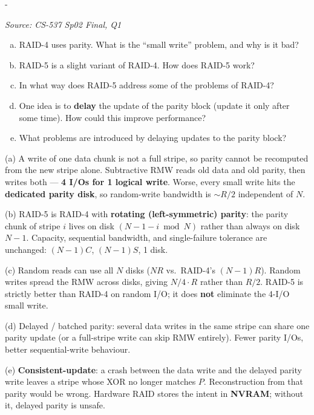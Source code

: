 \documentclass[11pt,a4paper]{article}
\makeatletter
\newcommand{\keepspace}[1]{\par\penalty-100\begingroup
  \setlength{\dimen@}{#1}\dimen@ii\pagegoal\advance\dimen@ii-\pagetotal
  \ifdim\dimen@>\dimen@ii\ifdim\dimen@ii>\z@\vfil\fi\break\fi\endgroup}
\newcounter{qn}[section]
\newenvironment{Qn}[4]{%
  \refstepcounter{qn}\keepspace{7\baselineskip}%
  \begin{tcolorbox}[qboxstyle, title={Q\thesection.\theqn\ \ [#1 \textbar\ #2]\ \ #4}]%
  {\footnotesize\color{g3}\textit{Source: #3}}\par\smallskip%
}{%
  \end{tcolorbox}%
}
\newenvironment{Sol}{%
  \begin{tcolorbox}[sboxstyle, title={Solution}]%
}{%
  \end{tcolorbox}\vspace{0.35em}%
}
\makeatother
\begin{document}
\begin{Qn}{Medium-Hard}{Lect 22A}{CS-537 Sp02 Final, Q1}{The small-write problem, RAID-5, and delayed parity}
\begin{enumerate}[(a)]
\item RAID-4 uses parity. What is the ``small write'' problem, and why
      is it bad?
\item RAID-5 is a slight variant of RAID-4. How does RAID-5 work?
\item In what way does RAID-5 address some of the problems of RAID-4?
\item One idea is to \textbf{delay} the update of the parity block
      (update it only after some time). How could this improve
      performance?
\item What problems are introduced by delaying updates to the parity
      block?
\end{enumerate}
\end{Qn}
\begin{Sol}
(a) A write of one data chunk is not a full stripe, so parity cannot be
recomputed from the new stripe alone. Subtractive RMW reads old data
and old parity, then writes both --- \textbf{4 I/Os for 1 logical
write}. Worse, every small write hits the \textbf{dedicated parity
disk}, so random-write bandwidth is $\sim R/2$ independent of $N$.

(b) RAID-5 is RAID-4 with \textbf{rotating (left-symmetric) parity}:
the parity chunk of stripe $i$ lives on disk $(N-1-i \bmod N)$ rather
than always on disk $N-1$. Capacity, sequential bandwidth, and
single-failure tolerance are unchanged: $(N-1)C$, $(N-1)S$, 1 disk.

(c) Random reads can use all $N$ disks ($NR$ vs.\ RAID-4's $(N-1)R$).
Random writes spread the RMW across disks, giving $N/4\cdot R$ rather
than $R/2$. RAID-5 is strictly better than RAID-4 on random I/O; it
does \textbf{not} eliminate the 4-I/O small write.

(d) Delayed / batched parity: several data writes in the same stripe
can share one parity update (or a full-stripe write can skip RMW
entirely). Fewer parity I/Os, better sequential-write behaviour.

(e) \textbf{Consistent-update}: a crash between the data write and the
delayed parity write leaves a stripe whose XOR no longer matches $P$.
Reconstruction from that parity would be wrong. Hardware RAID stores
the intent in \textbf{NVRAM}; without it, delayed parity is unsafe.
\end{Sol}
\end{document}

